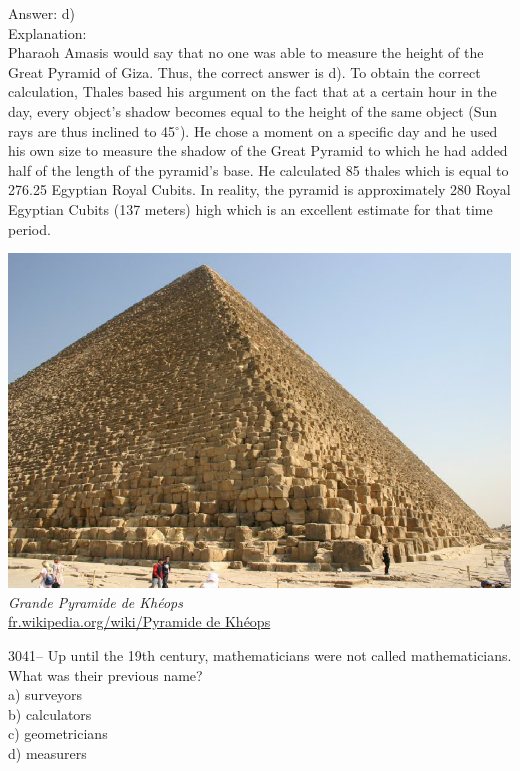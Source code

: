 \documentclass[letterpaper, 12pt]{article}
\begin{document}
Answer: d)\\

Explanation:\\
Pharaoh Amasis would say that no one was able to measure the height of the Great Pyramid of Giza. Thus, the correct answer is d). To obtain the correct calculation, Thales based his argument on the fact that at a certain hour in the day, every object's shadow becomes equal to the height of the same object (Sun rays are thus inclined to 45$^\circ$).  He chose a moment on a specific day and he used his own size to measure the shadow of the Great Pyramid to which he had added half of the length of the pyramid's base. He calculated 85 thales which is equal to 276.25 Egyptian Royal Cubits. In reality, the pyramid is approximately 280 Royal Egyptian Cubits (137 meters) high which is an excellent estimate for that time period.\\
\begin{center}
\includegraphics[scale=0.5]{pyramide.eps}\\
\emph{{\small Grande Pyramide de Kh\'eops}}\\
\href{http://fr.wikipedia.org/wiki/Pyramide de Kh\%C3\%A9ops}{fr.wikipedia.org/wiki/Pyramide de Kh\'eops}\\[5mm]
\end{center}



3041-- Up until the 19th century, mathematicians were not called mathematicians. What was their previous name?\\

a) surveyors\\
b) calculators\\
c) geometricians\\
d) measurers\\
\end{document}
